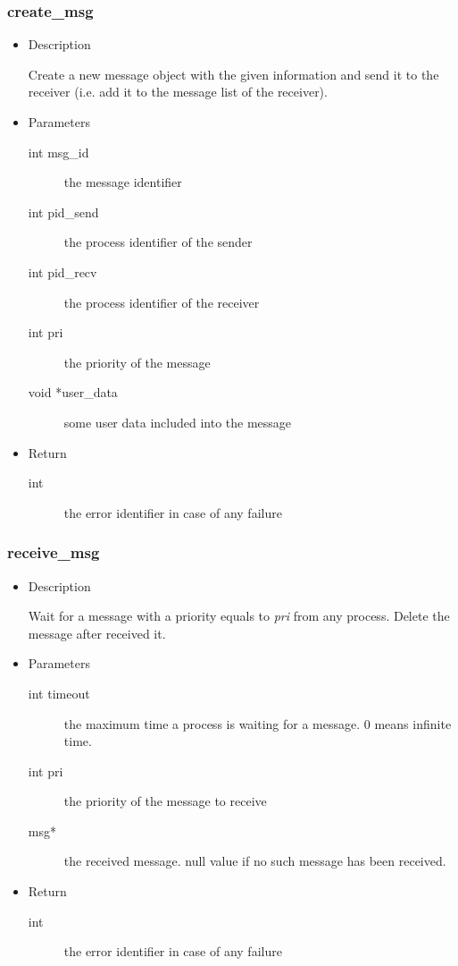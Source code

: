 \subsubsection{create\_msg}
\begin{itemize}
\item{Description}

  Create a new message object with the given information and send it to
  the receiver (i.e. add it to the message list of the receiver).
\item{Parameters}
  \begin{description}
	 \item[int msg\_id] the message identifier
	 \item[int pid\_send] the process identifier of the sender
	 \item[int pid\_recv] the process identifier of the receiver
	 \item[int pri] the priority of the message
	 \item[void *user\_data] some user data included into the message
	 \end{description}
  \item{Return}
	 \begin{description}
		\item[int] the error identifier in case of any failure
	 \end{description}
\end{itemize}

\subsubsection{receive\_msg}
\begin{itemize}
  \item{Description}

	 Wait for a message with a priority equals to \textit{pri} from any
	 process. Delete the message after received it.
  \item{Parameters}
	 \begin{description}
		\item[int timeout] the maximum time a process is waiting for a message. 0 means infinite time.
		\item[int pri] the priority of the message to receive
		\item[msg*] the received message. null value if no such
		  message has been received.
	 \end{description}
  \item{Return}
	 \begin{description}
		\item[int] the error identifier in case of any failure
	 \end{description}
\end{itemize}

